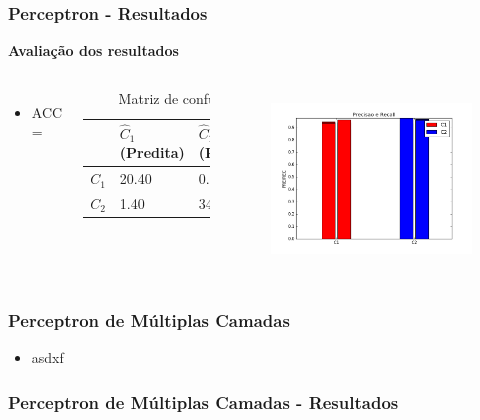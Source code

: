 \documentclass{beamer}
\begin{document}
\begin{frame}
\frametitle{Perceptron - Resultados}
\textbf{Avaliação dos resultados}
\begin{columns}[c] 
\begin{itemize}
\item ACC = 
\end{itemize}

\begin{table}
\begin{tabular}{l l l}
\toprule
 & \textbf{$\hat{C}_1$ (Predita)} & \textbf{$\hat{C}_2$(Predita)}\\
\midrule
$C_1$ & 20.40&0.80\\ 
$C_2$ & 1.40&34.30\\ 
\bottomrule
\end{tabular}
\caption{Matriz de confusão}
\end{table}


\begin{figure}[H]
\centering
  \includegraphics[width=\linewidth]{../img/perc_rec.png}
  \label{fig:percep}
\end{figure}%

\end{columns}
\end{frame}


\begin{frame}
\frametitle{Perceptron de Múltiplas Camadas}
\begin{itemize}
  \item asdxf
\end{itemize}
\end{frame}

\begin{frame}
\frametitle{Perceptron de Múltiplas Camadas - Resultados}

\end{frame}
\end{document}
